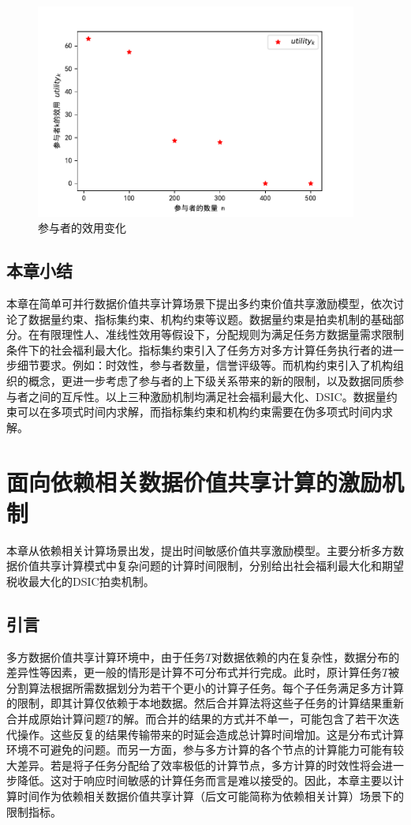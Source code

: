 \documentclass[promaster]{thesis-uestc}
\begin{document}
\begin{figure}[H]
\includegraphics[width=300pt]{exp/utility.pdf}
\caption{参与者的效用变化}
\label{utility}
\end{figure}

\FloatBarrier

\section{本章小结}
本章在简单可并行数据价值共享计算场景下提出多约束价值共享激励模型，依次讨论了数据量约束、指标集约束、机构约束等议题。数据量约束是拍卖机制的基础部分。在有限理性人、准线性效用等假设下，分配规则为满足任务方数据量需求限制条件下的社会福利最大化。指标集约束引入了任务方对多方计算任务执行者的进一步细节要求。例如：时效性，参与者数量，信誉评级等。而机构约束引入了机构组织的概念，更进一步考虑了参与者的上下级关系带来的新的限制，以及数据同质参与者之间的互斥性。以上三种激励机制均满足社会福利最大化、DSIC。数据量约束可以在多项式时间内求解，而指标集约束和机构约束需要在伪多项式时间内求解。

\chapter{面向依赖相关数据价值共享计算的激励机制}
本章从依赖相关计算场景出发，提出时间敏感价值共享激励模型。主要分析多方数据价值共享计算模式中复杂问题的计算时间限制，分别给出社会福利最大化和期望税收最大化的DSIC拍卖机制。

\section{引言}
多方数据价值共享计算环境中，由于任务$T$对数据依赖的内在复杂性，数据分布的差异性等因素，更一般的情形是计算不可分布式并行完成。此时，原计算任务$T$被分割算法根据所需数据划分为若干个更小的计算子任务。每个子任务满足多方计算的限制，即其计算仅依赖于本地数据。然后合并算法将这些子任务的计算结果重新合并成原始计算问题$T$的解。而合并的结果的方式并不单一，可能包含了若干次迭代操作。这些反复的结果传输带来的时延会造成总计算时间增加。这是分布式计算环境不可避免的问题。而另一方面，参与多方计算的各个节点的计算能力可能有较大差异。若是将子任务分配给了效率极低的计算节点，多方计算的时效性将会进一步降低。这对于响应时间敏感的计算任务而言是难以接受的。因此，本章主要以计算时间作为依赖相关数据价值共享计算（后文可能简称为依赖相关计算）场景下的限制指标。
\end{document}
